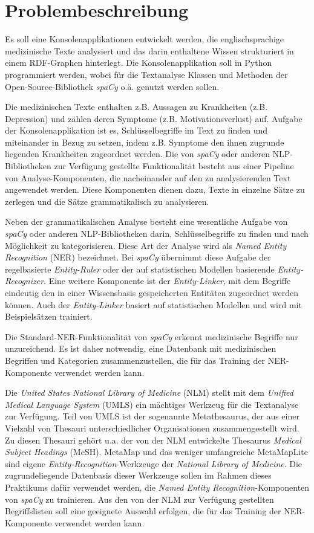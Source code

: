 \chapter{Problembeschreibung}
\label{ch:problembeschreibung}

Es soll eine Konsolenapplikationen entwickelt werden, die englischsprachige medizinische Texte analysiert und das darin enthaltene Wissen strukturiert in einem RDF-Graphen hinterlegt. Die Konsolenapplikation soll in Python programmiert werden, wobei für die Textanalyse Klassen und Methoden der Open-Source-Bibliothek \emph{spaCy} o.ä. genutzt werden sollen.

Die medizinischen Texte enthalten z.B. Aussagen zu Krankheiten (z.B. Depression) und zählen deren Symptome (z.B. Motivationsverlust) auf. Aufgabe der Konsolenapplikation ist es, Schlüsselbegriffe im Text zu finden und miteinander in Bezug zu setzen, indem z.B. Symptome den ihnen zugrunde liegenden Krankheiten zugeordnet werden. Die von \emph{spaCy} oder anderen NLP-Bibliotheken zur Verfügung gestellte Funktionalität besteht aus einer Pipeline von Analyse-Komponenten, die nacheinander auf den zu analysierenden Text angewendet werden. Diese Komponenten dienen dazu, Texte in einzelne Sätze zu zerlegen und die Sätze grammatikalisch zu analysieren.

Neben der grammatikalischen Analyse besteht eine wesentliche Aufgabe von \emph{spaCy} oder anderen NLP-Bibliotheken darin, Schlüsselbegriffe zu finden und nach Möglichkeit zu kategorisieren. Diese Art der Analyse wird als \emph{Named Entity Recognition} (NER) bezeichnet. Bei \emph{spaCy} übernimmt diese Aufgabe der regelbasierte \emph{Entity-Ruler} oder der auf statistischen Modellen basierende \emph{Entity-Recognizer}. Eine weitere Komponente ist der \emph{Entity-Linker}, mit dem Begriffe eindeutig den in einer Wissensbasis gespeicherten Entitäten zugeordnet werden können. Auch der \emph{Entity-Linker} basiert auf statistischen Modellen und wird mit Beispielsätzen trainiert.

Die Standard-NER-Funktionalität von \emph{spaCy} erkennt medizinische Begriffe nur unzureichend. Es ist daher notwendig, eine Datenbank mit medizinischen Begriffen und Kategorien zusammenzustellen, die für das Training der NER-Komponente verwendet werden kann.

Die \emph{United States National Library of Medicine} (NLM) stellt mit dem \emph{Unified Medical Language System} (UMLS) ein mächtiges Werkzeug für die Textanalyse zur Verfügung. Teil von UMLS ist der sogenannte Metathesaurus, der aus einer Vielzahl von Thesauri unterschiedlicher Organisationen zusammengestellt wird. Zu diesen Thesauri gehört u.a. der von der NLM entwickelte Thesaurus \emph{Medical Subject Headings} (MeSH). MetaMap und das weniger umfangreiche MetaMapLite sind eigene \emph{Entity-Recognition}-Werkzeuge der \emph{National Library of Medicine}. Die zugrundeliegende Datenbasis dieser Werkzeuge sollen im Rahmen dieses Praktikums dafür verwendet werden, die \emph{Named Entity Recognition}-Komponenten von \emph{spaCy} zu trainieren. Aus den von der NLM zur Verfügung gestellten Begriffslisten soll eine geeignete Auswahl erfolgen, die für das Training der NER-Komponente verwendet werden kann.

